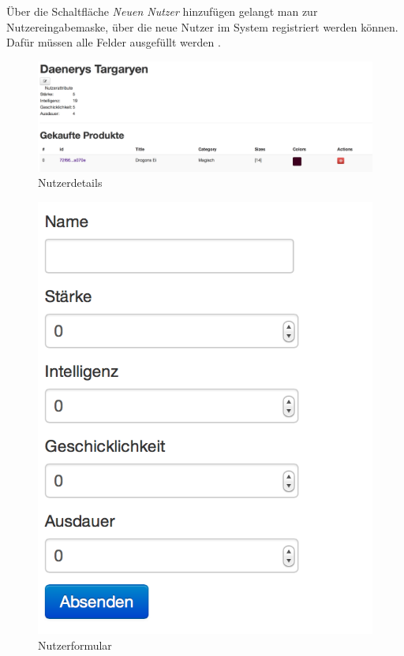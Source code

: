 Über die Schaltfläche \textit{Neuen Nutzer} hinzufügen gelangt man zur Nutzereingabemaske, über die neue Nutzer im System registriert werden können. Dafür müssen alle Felder ausgefüllt werden .
\begin{figure}[h!]
  \centering
  \includegraphics[width=\textwidth]{img/Nutzerdetails.png}
  \caption{Nutzerdetails}
  \label{fig:Nutzerdetails}
\end{figure}

\begin{figure}[h!]
  \centering
  \includegraphics[scale=0.5]{img/Nutzerformular.png}
  \caption{Nutzerformular}
  \label{fig:Nutzerformular}
\end{figure}

